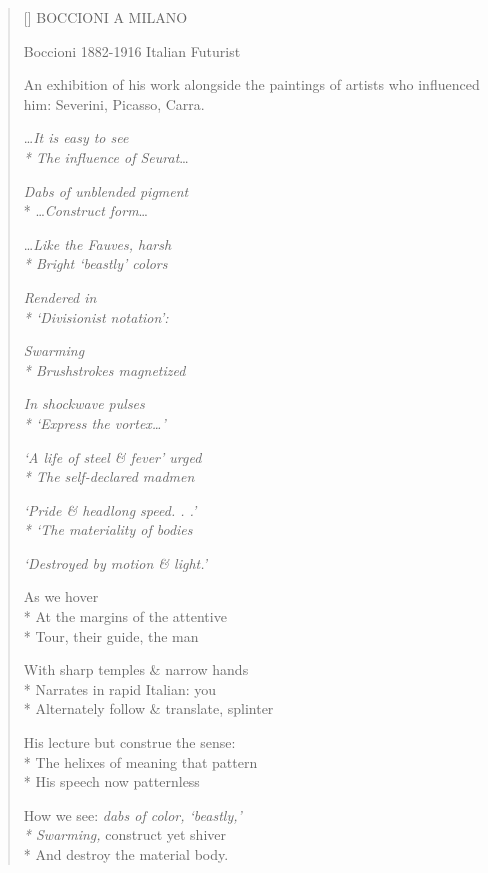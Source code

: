\label{ch:milano_commune_di_milano}
\settowidth{\versewidth}{An exhibition of his work alongside the paintings of artists who influenced him: Severini, Picasso, Carra.}
\begin{verse}[\versewidth]
BOCCIONI A MILANO

Boccioni 1882-1916  Italian Futurist

An exhibition of his work alongside the paintings of artists who influenced him: Severini, Picasso, Carra.

\ldots \textit{It is easy to see\\*
The influence of Seurat}\ldots

\textit{Dabs of unblended pigment}\\*
\ldots \textit{Construct form}\ldots

\ldots \textit{Like the Fauves, harsh\\*
Bright `beastly' colors}

\textit{Rendered in\\*
`Divisionist notation':}

\textit{Swarming\\*
Brushstrokes magnetized}

\textit{In shockwave pulses\\*
`Express the vortex\ldots'}

\textit{`A life of steel \& fever' urged\\*
The self-declared madmen}

\textit{`Pride \& headlong speed. . .'\\*
`The materiality of bodies}

\textit{`Destroyed by motion \& light.'}

\hspace*{3\vgap} As we hover\\*
At the margins of the attentive\\*
Tour, their guide, the man

With sharp temples \& narrow hands\\*
Narrates in rapid Italian: \qquad you\\*
Alternately follow \& translate, splinter

His lecture but construe the sense:\\*
The helixes of meaning that pattern\\*
His speech now patternless

How we see: \textit{dabs of color, `beastly,'\\*
Swarming,} \qquad construct \qquad yet shiver\\*
And destroy the material body.
\end{verse}
